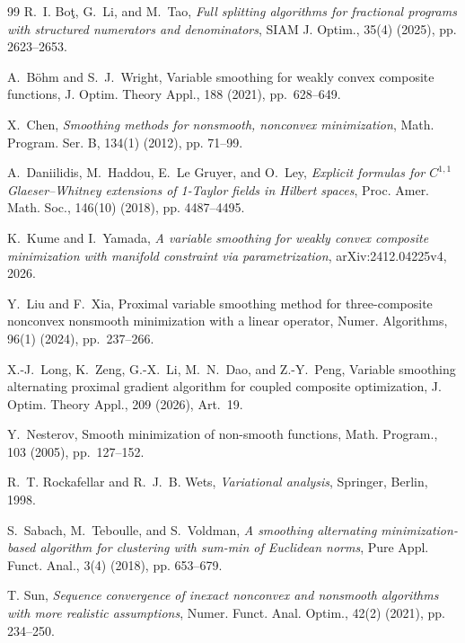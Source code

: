 \documentclass[11pt]{article}
\numberwithin{equation}{section}
\begin{document}
\begin{thebibliography}{99}
R.~I. Bo\c{t}, G.~Li, and M.~Tao,
{\em Full splitting algorithms for fractional programs with structured numerators
and denominators},
SIAM J. Optim., 35(4) (2025), pp. 2623--2653.

A.~B\"ohm and S.~J.~Wright,
Variable smoothing for weakly convex composite functions,
J. Optim. Theory Appl., 188 (2021), pp.~628--649.



X.~Chen,
{\em Smoothing methods for nonsmooth, nonconvex minimization},
Math. Program. Ser. B, 134(1) (2012), pp. 71--99.

A.~Daniilidis, M.~Haddou, E.~Le Gruyer, and O.~Ley,
{\em Explicit formulas for \(C^{1,1}\) Glaeser--Whitney extensions of 1-Taylor
fields in Hilbert spaces},
Proc. Amer. Math. Soc., 146(10) (2018), pp. 4487--4495.

K.~Kume and I.~Yamada,
{\em A variable smoothing for weakly convex composite minimization
with manifold constraint via parametrization},
\newblock arXiv:2412.04225v4, 2026.

Y.~Liu and F.~Xia,
Proximal variable smoothing method for three-composite nonconvex nonsmooth
minimization with a linear operator,
Numer. Algorithms, 96(1) (2024), pp.~237--266.

X.-J.~Long, K.~Zeng, G.-X.~Li, M.~N.~Dao, and Z.-Y.~Peng,
Variable smoothing alternating proximal gradient algorithm for coupled
composite optimization,
J. Optim. Theory Appl., 209 (2026), Art.~19.




Y.~Nesterov,
Smooth minimization of non-smooth functions,
Math. Program., 103 (2005), pp.~127--152.

 R.~T. Rockafellar and R.~J.~B. Wets, {\em Variational analysis}, Springer, Berlin, 1998.

S.~Sabach, M.~Teboulle, and S.~Voldman,
{\em A smoothing alternating minimization-based algorithm for clustering with
sum-min of Euclidean norms},
Pure Appl. Funct. Anal., 3(4) (2018), pp. 653--679.

 T. Sun, {\em Sequence convergence of inexact nonconvex and nonsmooth algorithms with more realistic assumptions},
Numer. Funct. Anal. Optim., 42(2)  (2021), pp. 234--250.







\end{thebibliography}
\end{document}
